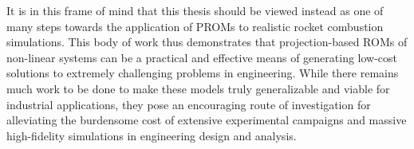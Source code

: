 It is in this frame of mind that this thesis should be viewed instead as one of many steps towards the application of PROMs to realistic rocket combustion simulations. This body of work thus demonstrates that projection-based ROMs of non-linear systems can be a practical and effective means of generating low-cost solutions to extremely challenging problems in engineering. While there remains much work to be done to make these models truly generalizable and viable for industrial applications, they pose an encouraging route of investigation for alleviating the burdensome cost of extensive experimental campaigns and massive high-fidelity simulations in engineering design and analysis.
